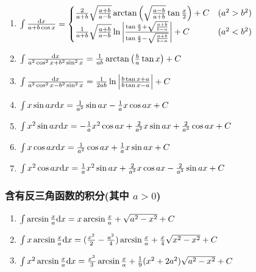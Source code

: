 \begin{small}
\begin{enumerate}
\item $ \int \frac{\mathrm{d} x}{a + b \cos x} = \begin{cases}
\frac{2}{a+b}\sqrt\frac{a+b}{a-b} \arctan\left(\sqrt\frac{a-b}{a+b}\tan\frac{x}{2}\right) + C & (a^2 > b^2) \\
\frac{1}{a+b}\sqrt\frac{a+b}{a-b} \ln \left| \frac{\tan\frac{x}{2}+\sqrt\frac{a+b}{b-a}}{\tan\frac{x}{2}-\sqrt\frac{a+b}{b-a}} \right| + C
& (a^2 < b^2)
\end{cases} $

\item $ \int \frac{\mathrm{d} x}{a^2\cos^2x+b^2\sin^2x} = \frac{1}{ab} \arctan\left( \frac{b}{a}\tan x \right) + C $

\item $ \int \frac{\mathrm{d} x}{a^2\cos^2x-b^2\sin^2x} = \frac{1}{2ab}\ln\left|\frac{b\tan x+a}{b\tan x-a}\right| + C $

\item $ \int x \sin ax \mathrm{d} x = \frac{1}{a^2} \sin ax - \frac{1}{a} x \cos ax + C $

\item $ \int x^2 \sin ax \mathrm{d} x = -\frac{1}{a} x^2 \cos ax + \frac{2}{a^2} x \sin ax + \frac{2}{a^3} \cos ax + C$

\item $ \int x \cos ax \mathrm{d} x = \frac{1}{a^2} \cos ax + \frac{1}{a} x \sin ax + C $

\item $ \int x^2 \cos ax \mathrm{d} x = \frac{1}{a} x^2 \sin ax + \frac{2}{a^2} x \cos ax - \frac{2}{a^3} \sin ax + C $

\end{enumerate}

\subsubsection{含有反三角函数的积分(其中 $a>0$)}

\begin {enumerate}

\item $ \int \arcsin \frac{x}{a} \mathrm{d} x = x \arcsin \frac{x}{a} + \sqrt{a^2-x^2}+C $

\item $ \int x \arcsin \frac{x}{a} \mathrm{d} x= (\frac{x^2}{2}-\frac{a^2}{4})\arcsin \frac{x}{a} + \frac{x}{4} \sqrt{x^2-x^2}+C$

\item $ \int x^2 \arcsin \frac{x}{a} \mathrm{d} x = \frac{x^3}{3}\arcsin \frac{x}{a}+\frac{1}{9}(x^2+2 a^2)\sqrt{a^2-x^2}+C $


\end{enumerate}
\end{small}
